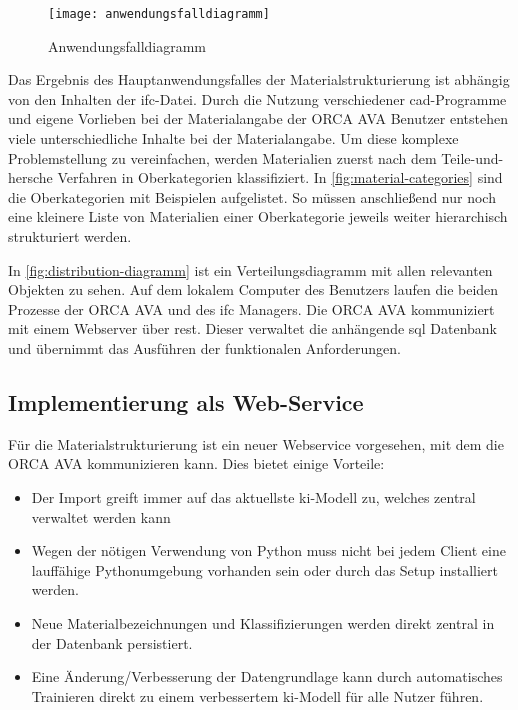 \begin{figure}[h]
	\centering
	\texttt{[image: anwendungsfalldiagramm]}
	\caption{Anwendungsfalldiagramm}
	\label{fig:usecasediagramm}
\end{figure}

Das Ergebnis des Hauptanwendungsfalles der Materialstrukturierung ist abhängig von den Inhalten der \ac{ifc}-Datei. Durch die Nutzung verschiedener \ac{cad}-Programme und eigene Vorlieben bei der Materialangabe der ORCA AVA Benutzer entstehen viele unterschiedliche Inhalte bei der Materialangabe. Um diese komplexe Problemstellung zu vereinfachen, werden Materialien zuerst nach dem \glqq Teile-und-hersche\grqq{} Verfahren in Oberkategorien klassifiziert. In \autoref{fig:material-categories} sind die Oberkategorien mit Beispielen aufgelistet. So müssen anschließend nur noch eine kleinere Liste von Materialien einer Oberkategorie jeweils weiter hierarchisch strukturiert werden.

In \autoref{fig:distribution-diagramm} ist ein Verteilungsdiagramm mit allen relevanten Objekten zu sehen. Auf dem lokalem Computer des Benutzers laufen die beiden Prozesse der ORCA AVA und des \ac{ifc} Managers. Die ORCA AVA kommuniziert mit einem Webserver über \ac{rest}. Dieser verwaltet die anhängende \ac{sql} Datenbank und übernimmt das Ausführen der funktionalen Anforderungen.

\subsection{Implementierung als Web-Service}
\label{c:conception:architecture:service}
Für die Materialstrukturierung ist ein neuer Webservice vorgesehen, mit dem die ORCA AVA kommunizieren kann. Dies bietet einige Vorteile:

\begin{itemize}
	\setlength\itemsep{0.3em}
	\item Der Import greift immer auf das aktuellste \ac{ki}-Modell zu, welches zentral verwaltet werden kann
	\item Wegen der nötigen Verwendung von Python muss nicht bei jedem Client eine lauffähige Pythonumgebung vorhanden sein oder durch das Setup installiert werden.
	\item Neue Materialbezeichnungen und Klassifizierungen werden direkt zentral in der Datenbank persistiert.
	\item Eine Änderung/Verbesserung der Datengrundlage kann durch automatisches Trainieren direkt zu einem verbessertem \ac{ki}-Modell für alle Nutzer führen.
\end{itemize}

